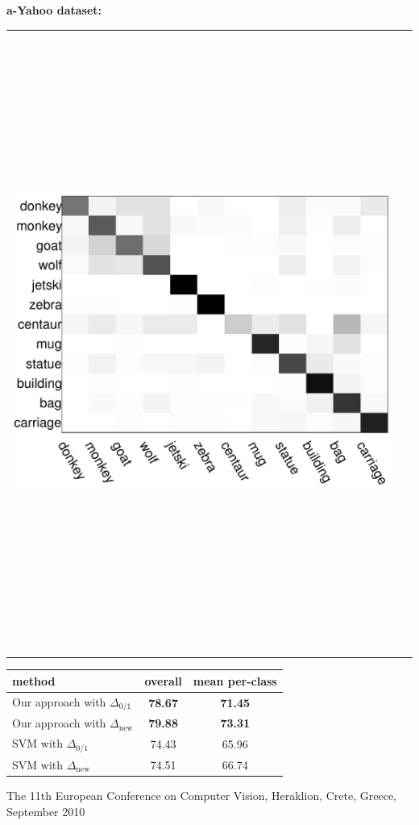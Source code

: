 \documentclass[a0]{a0poster}
\begin{document}
\begin{center}
{\vspace{2cm}

\begin{center}
{\Large\bf a-Yahoo dataset:}
\end{center}

\begin{center}
\begin{tabular}{cc}
\includegraphics[height=8in, width=11in]{fig/yahoo_conf}&
\end{tabular}
\end{center}

{\Large
\begin{center}
\begin{tabular}{|l||c|c|}
\hline
method & overall & mean per-class\\
\hline\hline
Our approach with $\Delta_{0/1}$ & {\bf 78.67} & {\bf 71.45}\\
Our approach with $\Delta_{\mathrm{new}}$ & {\bf 79.88} & {\bf 73.31}\\
\hline
SVM with $\Delta_{0/1}$ & 74.43 & 65.96\\
SVM with $\Delta_{\mathrm{new}}$ & 74.51 & 66.74\\
\hline
\end{tabular}
\end{center}
}
}
%
\end{center}

\vfill
\begin{center}
{\color{DarkBlue}\LARGE \hspace{5cm}The 11th European Conference on Computer Vision, Heraklion, Crete, Greece, September 2010\hspace{5cm}}\\
\end{center}
\end{document}

